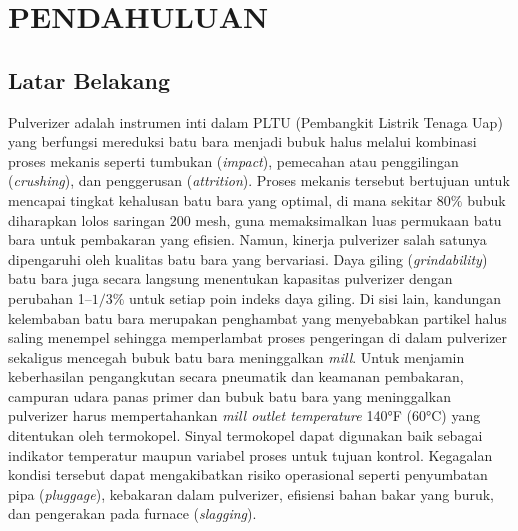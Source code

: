 \renewcommand{\thechapter}{\Roman{chapter}}
\chapter{PENDAHULUAN}
\renewcommand{\thechapter}{\arabic{chapter}}
\pagestyle{konten}

\section{Latar Belakang}

Pulverizer adalah instrumen inti dalam PLTU (Pembangkit Listrik Tenaga Uap) yang berfungsi mereduksi batu bara menjadi bubuk halus melalui kombinasi proses mekanis seperti tumbukan (\textit{impact}), pemecahan atau penggilingan (\textit{crushing}), dan penggerusan (\textit{attrition}). Proses mekanis tersebut bertujuan untuk mencapai tingkat kehalusan batu bara yang optimal, di mana sekitar $80\%$ bubuk diharapkan lolos saringan 200 mesh, guna memaksimalkan luas permukaan batu bara untuk pembakaran yang efisien. Namun, kinerja pulverizer salah satunya dipengaruhi oleh kualitas batu bara yang bervariasi. Daya giling (\textit{grindability}) batu bara juga secara langsung menentukan kapasitas pulverizer dengan perubahan 1–$1/3\%$ untuk setiap poin indeks daya giling. Di sisi lain, kandungan kelembaban batu bara merupakan penghambat yang menyebabkan partikel halus saling menempel sehingga memperlambat proses pengeringan di dalam pulverizer sekaligus mencegah bubuk batu bara meninggalkan \textit{mill}. Untuk menjamin keberhasilan pengangkutan secara pneumatik dan keamanan pembakaran, campuran udara panas primer dan bubuk batu bara yang meninggalkan pulverizer harus mempertahankan \textit{mill outlet temperature} 140°F (60°C) yang ditentukan oleh termokopel. Sinyal termokopel dapat digunakan baik sebagai indikator temperatur maupun variabel proses untuk tujuan kontrol. Kegagalan kondisi tersebut dapat mengakibatkan risiko operasional seperti penyumbatan pipa (\textit{pluggage}), kebakaran dalam pulverizer, efisiensi bahan bakar yang buruk, dan pengerakan pada furnace (\textit{slagging}).

